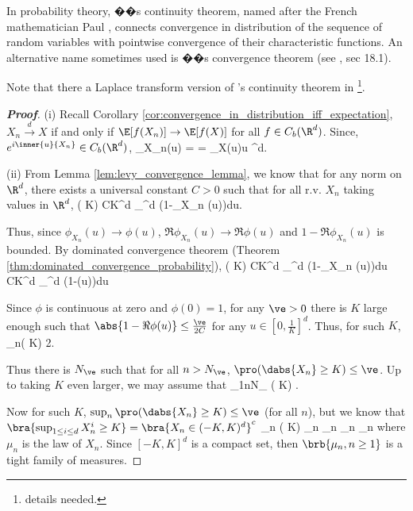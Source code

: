 \begin{remark}
In probability theory, \levy��s continuity theorem, named after the French mathematician Paul \levy, connects convergence in distribution of the sequence of random variables with pointwise convergence of their characteristic functions. An alternative name sometimes used is \levy��s convergence theorem (see \cite{Williams_1991}, sec 18.1).

Note that there a Laplace transform version of \levy's continuity theorem in \cite{Feller_1948}\footnote{details needed.}.
\end{remark}

\begin{proof}[\bf Proof]
\ben
\item [(i)] Recall Corollary \ref{cor:convergence_in_distribution_iff_expectation}, $X_n \stackrel{d}{\to} X$ if and only if $\E[ f (X_n)]\to \E[ f (X)]$ for all $f \in C_b(\R^d )$. Since, $e^{i\inner{u}{X_n}}\in C_b(\R^d)$,
\be
\phi_{X_n}(u) = \E {} \to \E {}= \phi_X(u)\quad \forall u \in \R^d.
\ee

\item [(ii)] From Lemma \ref{lem:levy_convergence_lemma}, we know that for any norm on $\R^d$, there exists a universal constant $C > 0$ such that for all r.v. $X_n$ taking values in $\R^d$,
\be
\pro( \geq K) \leq CK^d \int_{^d} (1-\Re\phi_{X_n} (u))du.
\ee

Thus, since $\phi_{X_n} (u) \to  \phi(u)$, $\Re \phi_{X_n} (u) \to  \Re \phi(u)$ and $1-\Re \phi_{X_n}(u)$ is bounded. By dominated convergence theorem (Theorem \ref{thm:dominated_convergence_probability}),
\be
\pro( \geq K) \leq CK^d \int_{^d} (1-\Re\phi_{X_n} (u))du \to CK^d \int_{^d} (1-\Re\phi (u))du
\ee

Since $\phi$ is continuous at zero and $\phi(0) = 1$, for any $\ve > 0$ there is $K$ large enough such that $\abs{1-\Re\phi(u)} \leq \frac{\ve}{2C}$ for any $u\in [0, \frac 1K ]^d$. Thus, for such $K$,
\be
\limsup_n\pro( \geq K) \leq \frac{\ve}2.
\ee

Thus there is $N_\ve$ such that for all $n > N_\ve$, $\pro(\dabs{X_n} \geq K) \leq \ve$. Up to taking $K$ even larger, we may assume that
\be
\sup_{1\leq n\leq N_\ve} \pro( \geq K) \leq \ve.
\ee

Now for such $K$, $\sup_n \pro(\dabs{X_n} \geq K) \leq \ve$ (for all $n$), but we know that $\bra{\sup_{1\leq i\leq d}X_n^i \geq K} = \bra{X_n \in (-K,K)^d}^c$
\be
\sup_n \pro( \geq K) \leq \ve\quad \lra\quad \sup_n \mu_n \leq \ve \quad\ra\quad \sup_n \mu_n\leq \ve
\ee
where $\mu_n$ is the law of $X_n$. Since $[-K, K]^d$ is a compact set, then $\brb{\mu_n,n\geq1}$ is a tight family of measures.


\end{proof}
